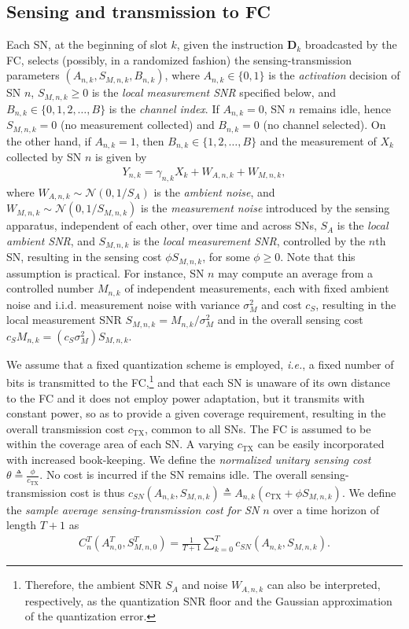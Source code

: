 \documentclass[10pt,twocolumn,twoside]{IEEEtran}
\theoremstyle{plain}
\begin{document}
\subsection{Sensing and transmission to FC}
 \label{ph2}
\noindent  Each SN, at the beginning of slot $k$, given the instruction $\mathbf D_k$ broadcasted by the FC,
  selects (possibly, in a randomized fashion) 
  the sensing-transmission parameters $(A_{n,k},S_{M,n,k},B_{n,k})$, 
 where $A_{n,k}{\in}\{0,1\}$ is the \emph{activation} decision of SN $n$,
 $S_{M,n,k}{\geq}0$ is the \emph{local measurement SNR} specified below, and $B_{n,k}{\in}\{0,1,2,\dots,B\}$ is the \emph{channel index}.
 If $A_{n,k}{=}0$, SN $n$ remains idle, hence $S_{M,n,k}{=}0$ (no measurement collected) and $B_{n,k}{=}0$ (no channel selected).
On the other hand, if $A_{n,k}{=}1$, then $B_{n,k}{\in}\{1,2,\dots,B\}$ and
 the measurement of $X_k$ collected by SN $n$ is given by
\begin{align}
\label{Ynk}
Y_{n,k}=\gamma_{n,k}X_{k}+W_{A,n,k}+W_{M,n,k},
\end{align}
where $W_{A,n,k}{\sim}\mathcal N(0,1/S_A)$ is the \emph{ambient noise},
and $W_{M,n,k}{\sim}\mathcal N(0,1/S_{M,n,k})$ is the \emph{measurement noise} introduced by the sensing apparatus,
independent of each other, over time and across SNs,
  $S_{A}$ is the  \emph{local ambient SNR}, and $S_{M,n,k}$ is the
   \emph{local measurement SNR}, controlled by the $n$th SN, resulting in the sensing cost $\phi S_{M,n,k}$, for some $\phi\geq 0$.
 Note that this assumption is practical. For instance,
 SN $n$ may compute an average from a controlled number $M_{n,k}$ of independent measurements, each with
fixed ambient noise and i.i.d. measurement noise with  variance $\sigma_M^2$
 and cost $c_S$,
 resulting in the local measurement SNR $S_{M,n,k}=M_{n,k}/\sigma_M^2$ and in the overall
 sensing cost $c_SM_{n,k}=(c_S\sigma_M^2)S_{M,n,k}$.

   
We assume that
   a fixed quantization scheme is employed, \emph{i.e.}, a fixed number of bits is transmitted to the FC,\footnote{Therefore, 
   the ambient SNR $S_A$ and noise $W_{A,n,k}$ can also be interpreted, respectively, as the quantization SNR floor and the Gaussian approximation of the quantization error.}
and that each SN is unaware of its own distance to the FC
and it does not employ power adaptation, but it
 transmits with constant power, so as to provide a given coverage requirement,
resulting in the overall transmission cost $c_{\mathrm{TX}}$, common to all SNs.
 The FC is assumed to be within the coverage area 
of each SN. A varying $c_{\mathrm{TX}}$ can be easily incorporated with increased book-keeping.
We define the \emph{normalized unitary sensing cost} $\theta\triangleq\frac{\phi}{c_{\mathrm{TX}}}$.
No cost is incurred if the SN remains idle.
The overall sensing-transmission cost
is thus $c_{SN}(A_{n,k},S_{M,n,k}){\triangleq}A_{n,k}(c_{\mathrm{TX}}+\phi S_{M,n,k})$.
We define the \emph{sample average sensing-transmission cost for SN $n$} over a time horizon of length $T+1$ as
\begin{align}
\label{ctn}
C_n^{T}(A_{n,0}^T,S_{M,n,0}^T)=\frac{1}{T+1}\sum_{k=0}^{T}c_{SN}(A_{n,k},S_{M,n,k}).
\end{align}
\end{document}
